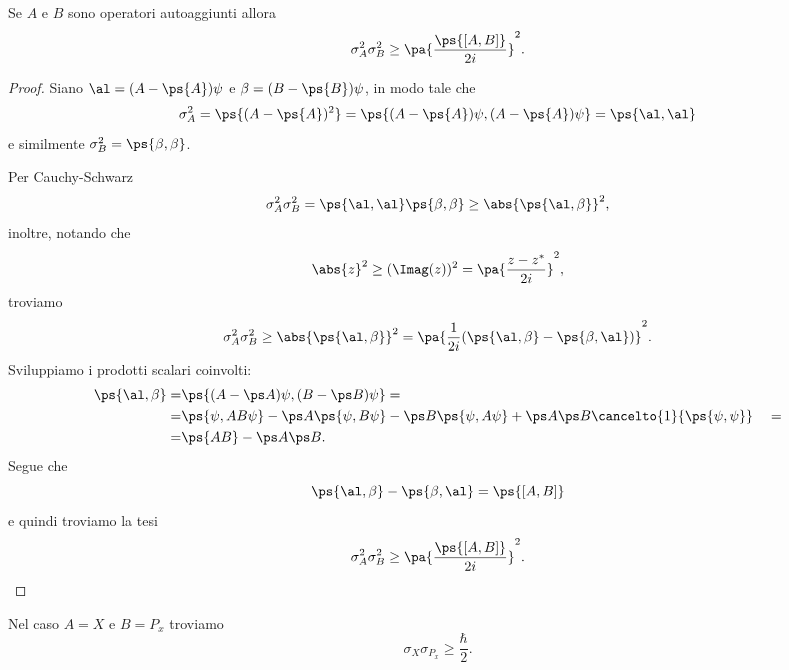 \begin{theorem}
Se $A$ e $B$ sono operatori autoaggiunti allora
\[\sigma_A^2\sigma_B^2\geq\pa{\frac{\ps{[A,B]}}{2i}}^2.\]
\end{theorem}
\begin{proof}
Siano $\al=(A-\ps{A})\psi$ e $\beta=(B-\ps{B})\psi$, in modo tale che 
\[\sigma_A^2=\ps{(A-\ps{A})^2}=\ps{(A-\ps{A})\psi,(A-\ps{A})\psi}=\ps{\al,\al}\]
e similmente $\sigma_B^2=\ps{\beta,\beta}$.\medskip

\noindent
Per Cauchy-Schwarz
\[\sigma_A^2\sigma_B^2=\ps{\al,\al}\ps{\beta,\beta}\geq\abs{\ps{\al,\beta}}^2,\]
inoltre, notando che
\[\abs{z}^2\geq (\Imag(z))^2=\pa{\frac{z-z^\ast}{2i}}^2,\]
troviamo
\[\sigma_A^2\sigma_B^2\geq\abs{\ps{\al,\beta}}^2=\pa{\frac1{2i}(\ps{\al,\beta}-\ps{\beta,\al})}^2.\]
Sviluppiamo i prodotti scalari coinvolti:
\begin{align*}
\ps{\al,\beta}=&\ps{(A-\ps A)\psi,(B-\ps B)\psi}=\\
=&\ps{\psi,AB\psi}-\ps A\ps{\psi,B\psi}-\ps B\ps{\psi,A\psi}+\ps A\ps B\cancelto{1}{\ps{\psi,\psi}}\ \ \ =\\
=&\ps{AB}-\ps A\ps B.
\end{align*}
Segue che
\[\ps{\al,\beta}-\ps{\beta,\al}=\ps{[A,B]}\]
e quindi troviamo la tesi
\[\sigma_A^2\sigma_B^2\geq\pa{\frac{\ps{[A,B]}}{2i}}^2.\]
\end{proof}
\begin{corollary}
Nel caso $A=X$ e $B=P_x$ troviamo
\[\sigma_X\sigma_{P_x}\geq\frac\hbar2.\]
\end{corollary}